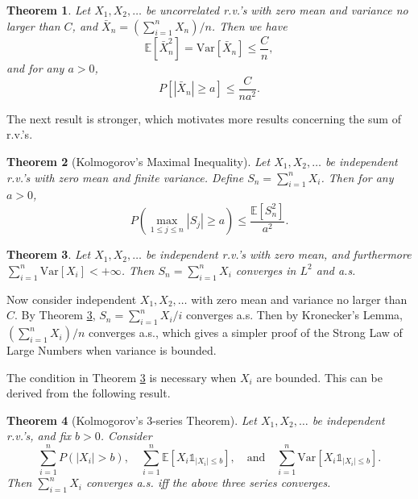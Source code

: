 \documentclass[openany]{book}
\newtheorem{theorem}{Theorem}[chapter]
\theoremstyle{definition}
\theoremstyle{remark}
\begin{document}
\begin{theorem}\label{thm:L2WeakLaw}
    Let $X_1,X_2,\ldots$ be uncorrelated r.v.'s with zero mean and variance no larger than $C$, and $\bar{X}_n=(\sum_{i=1}^{n}X_n)/n$. Then we have
    \begin{equation*}
        \mathbb{E}\left[\bar{X}_n^2\right]=\mathrm{Var}\left[\bar{X}_n\right]\le \frac{C}{n},
    \end{equation*}
    and for any $a>0$,
    \begin{equation*}
        P\left[\left|\bar{X}_n\right|\ge a\right]\le \frac{C}{na^2}.
    \end{equation*}
\end{theorem}
The next result is stronger, which motivates more results concerning the sum of r.v.'s.
\begin{theorem}[Kolmogorov's Maximal Inequality]
    Let $X_1,X_2,\ldots$ be independent r.v.'s with zero mean and finite variance. Define $S_n=\sum_{i=1}^{n}X_i$. Then for any $a>0$,
    \begin{equation*}
        P\left(\max_{1\le j\le n}|S_j|\ge a\right)\le \frac{\mathbb{E}[S_n^2]}{a^2}.
    \end{equation*}
\end{theorem}
\begin{theorem}\label{thm:L2Convergence}
    Let $X_1,X_2,\ldots$ be independent r.v.'s with zero mean, and furthermore $\sum_{i=1}^{n}\mathrm{Var}[X_i]<+\infty$. Then $S_n=\sum_{i=1}^{n}X_i$ converges in $L^2$ and a.s.
\end{theorem}
Now consider independent $X_1,X_2,\ldots$ with zero mean and variance no larger than $C$. By Theorem \ref{thm:L2Convergence}, $S_n=\sum_{i=1}^{n}X_i/i$ converges a.s. Then by Kronecker's Lemma, $\left(\sum_{i=1}^{n}X_i\right)/n$ converges a.s., which gives a simpler proof of the Strong Law of Large Numbers when variance is bounded.

The condition in Theorem \ref{thm:L2Convergence} is necessary when $X_i$ are bounded. This can be derived from the following result.
\begin{theorem}[Kolmogorov's 3-series Theorem]
    Let $X_1,X_2,\ldots$ be independent r.v.'s, and fix $b>0$. Consider
    \begin{equation*}
        \sum_{i=1}^{n}P\left(|X_i|>b\right),\quad \sum_{i=1}^{n}\mathbb{E}\left[X_i\mathds{1}_{|X_i|\le b}\right],\quad\textrm{and}\quad \sum_{i=1}^{n}\mathrm{Var}\left[X_i\mathds{1}_{|X_i|\le b}\right].
    \end{equation*}
    Then $\sum_{i=1}^{n}X_i$ converges a.s. iff the above three series converges.
\end{theorem}
\end{document}
